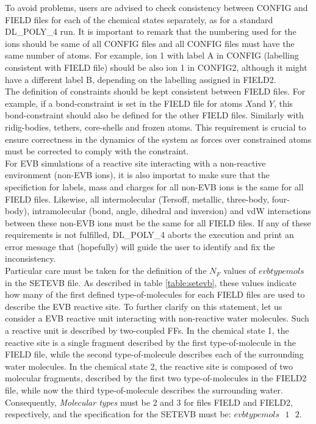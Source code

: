 To avoid problems, users are advised to check consistency between CONFIG and FIELD files for each of the chemical states separately, as for a standard DL\_POLY\_4 run. It is important to remark that the numbering used for the ions should be same of all CONFIG files and all CONFIG files must have the same number of atoms. For example, ion 1 with label A in CONFIG (labelling consistent with FIELD file) should be also ion 1 in CONFIG2, although it might have a different label B, depending on the labelling assigned in FIELD2.\\
The definition of constraints should be kept consistent between FIELD files. For example, if a bond-constraint is set in the FIELD file for atoms $X$and $Y$, this bond-constraint should also be defined for the other FIELD files. Similarly with ridig-bodies, tethers, core-shells and frozen atoms. This requirement is crucial to ensure correctness in the dynamics of the system as forces over constrained atoms must be corrected to comply with the constraint.\\ 
For EVB simulations of a reactive site interacting with a non-reactive environment (non-EVB ions), it is also importat to make sure that the specifiction for labels, mass and charges for all non-EVB ions is the same for all FIELD files. Likewise, all intermolecular (Tersoff, metallic, three-body, four-body), intramolecular (bond, angle, dihedral and inversion) and vdW interactions between these non-EVB ions must be the same for all FIELD files. If any of these requirements is not fulfilled, DL\_POLY\_4 aborts the execution and print an error message that (hopefully) will guide the user to identify and fix the inconsistency. \\ 
Particular care must be taken for the definition of the $N_F$ values of $evbtypemols$ in the SETEVB file. As described in table \ref{table:setevb}, these values indicate how many of the first defined type-of-molecules for each FIELD files are used to describe the EVB reactive site. To further clarify on this statement, let us consider a EVB reactive unit interacting with non-reactive water molecules. Such a reactive unit is described by two-coupled FFs. In the chemical state 1, the reactive site is a single fragment described by the first type-of-molecule in the FIELD file, while the second type-of-molecule describes each of the surrounding water molecules. In the chemical state 2, the reactive site is composed of two molecular fragments, described by the first two type-of-molecules in the FIELD2 file, while now the third type-of-molecule describes the surrounding water. Consequently, {\it Molecular types} must be 2 and 3 for files FIELD and FIELD2, respectively, and the specification for the SETEVB must be: $evbtypemols\,\,\,\,  1\,\,\,\,  2$.\\
